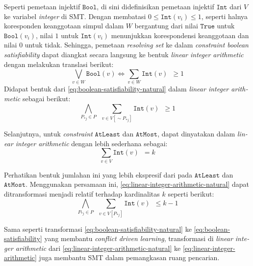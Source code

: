 \documentclass[10pt,twocolumn]{article}
\newcommand{\foreign}[1]{\foreignlanguage{english}{\textit{#1}}}
\def\True{\mathtt{True}}
\def\AtLeast{\mathtt{AtLeast}}
\def\AtMost{\mathtt{AtMost}}
\def\boolmap{\mathtt{Bool}}
\def\intmap{\mathtt{Int}}
\begin{document}
Seperti pemetaan injektif \(\boolmap\), di sini didefinisikan pemetaan injektif \(\intmap\) dari \(V\) ke variabel \foreign{integer} di SMT. Dengan membatasi \(0 \leq \intmap(v_i) \leq 1\), seperti halnya koresponden keanggotaan simpul dalam \(W\) bergantung dari nilai \(\True\) untuk \(\boolmap(v_i)\), nilai \(1\) untuk \(\intmap(v_i)\) menunjukkan korespondensi keanggotaan dan nilai \(0\) untuk tidak. Sehingga, pemetaan \foreign{resolving set} ke dalam \foreign{constraint boolean satisfiability} dapat diangkat secara langsung ke bentuk \foreign{linear integer arithmetic} dengan melakukan translasi berikut:
\[
	\bigvee \limits_{\displaystyle v \in W} \boolmap(v)
	\iff
	\sum \limits_{\displaystyle v \in W} \intmap(v) \enspace \geq 1
\]
Didapat bentuk dari \autoref{eq:boolean-satisfiability-natural} dalam \foreign{linear integer arithmetic} sebagai berikut:
\begin{equation}
	\bigwedge \limits_{\displaystyle P_{*j} \in P} \enspace \sum \limits_{\displaystyle v \in V[\sim\!P_{*j}]} \intmap(v) \enspace \geq 1
	\label{eq:linear-integer-arithmetic-natural}
\end{equation}

Selanjutnya, untuk \foreign{constraint} \(\AtLeast\) dan \(\AtMost\), dapat dinyatakan dalam \foreign{linear integer arithmetic} dengan lebih sederhana sebagai:
\begin{equation}
	\sum \limits_{\displaystyle v \in V} \intmap(v) \enspace = k
	\label{eq:linear-integer-arithmetic-cardinality}
\end{equation}

Perhatikan bentuk jumlahan ini yang lebih ekspresif dari pada \(\AtLeast\) dan \(\AtMost\). Menggunakan persamaan ini, \autoref{eq:linear-integer-arithmetic-natural} dapat ditransformasi menjadi relatif terhadap kardinalitas \(k\) seperti berikut:
\begin{equation}
	\bigwedge \limits_{\displaystyle P_{*j} \in P} \enspace \sum \limits_{\displaystyle v \in V[P_{*j}]} \intmap(v) \enspace \leq k - 1
	\label{eq:linear-integer-arithmetic}
\end{equation}

Sama seperti transformasi \autoref{eq:boolean-satisfiability-natural} ke \autoref{eq:boolean-satisfiability} yang membantu \foreign{conflict driven learning}, transformasi di \foreign{linear integer arithmetic} dari \autoref{eq:linear-integer-arithmetic-natural} ke \autoref{eq:linear-integer-arithmetic} juga membantu SMT dalam pemangkasan ruang pencarian.
\end{document}
